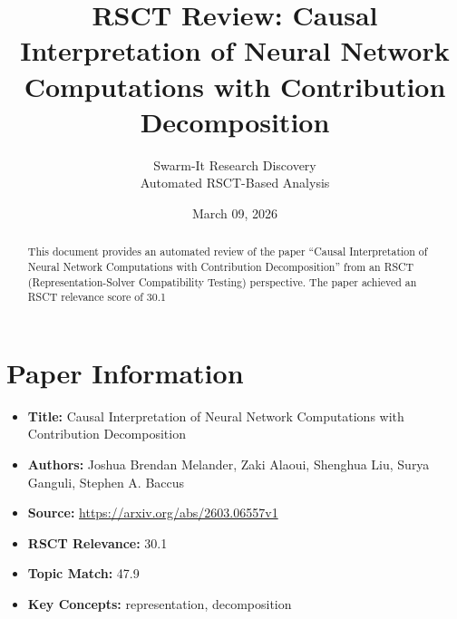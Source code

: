\documentclass[11pt,a4paper]{article}
\title{RSCT Review: Causal Interpretation of Neural Network Computations with Contribution Decomposition}
\author{Swarm-It Research Discovery\\\small Automated RSCT-Based Analysis}
\date{March 09, 2026}
\begin{document}
\maketitle

\begin{abstract}
This document provides an automated review of the paper ``Causal Interpretation of Neural Network Computations with Contribution Decomposition'' from an RSCT (Representation-Solver Compatibility Testing) perspective. The paper achieved an RSCT relevance score of 30.1%
\end{abstract}

\section{Paper Information}
\begin{itemize}
\item \textbf{Title:} Causal Interpretation of Neural Network Computations with Contribution Decomposition
\item \textbf{Authors:} Joshua Brendan Melander, Zaki Alaoui, Shenghua Liu, Surya Ganguli, Stephen A. Baccus
\item \textbf{Source:} \url{https://arxiv.org/abs/2603.06557v1}
\item \textbf{RSCT Relevance:} 30.1%
\item \textbf{Topic Match:} 47.9%
\item \textbf{Key Concepts:} representation, decomposition
\end{itemize}
\end{document}

